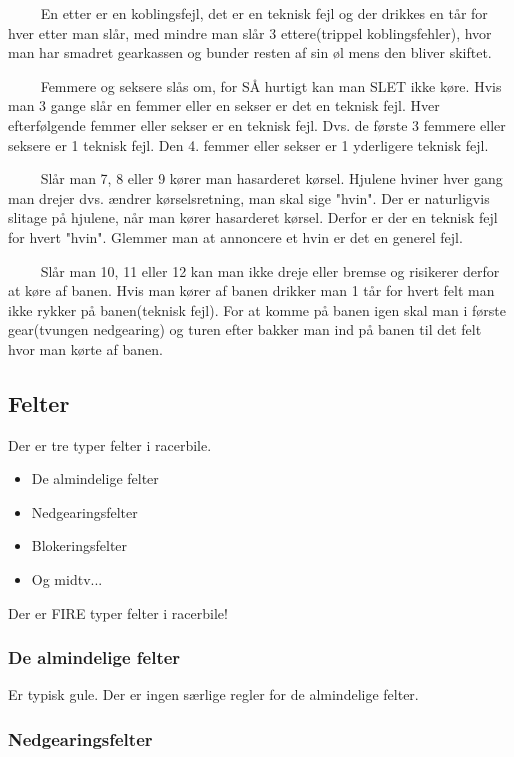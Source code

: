 \documentclass[12pt]{article}
\begin{document}
$\qquad$ En etter er en koblingsfejl, det er en teknisk fejl og der drikkes en tår for hver etter man slår, med mindre man slår 3 ettere(trippel koblingsfehler), hvor man har smadret gearkassen og bunder resten af sin øl mens den bliver skiftet.

$\qquad$ Femmere og seksere slås om, for SÅ hurtigt kan man SLET ikke køre. Hvis man 3 gange slår en femmer eller en sekser er det en teknisk fejl. Hver efterfølgende femmer eller sekser er en teknisk fejl. Dvs. de første 3 femmere eller seksere er 1 teknisk fejl. Den 4. femmer eller sekser er 1 yderligere teknisk fejl.

$\qquad$ Slår man 7, 8 eller 9 kører man hasarderet kørsel. Hjulene hviner hver gang man drejer dvs. ændrer kørselsretning, man skal sige "hvin". Der er naturligvis slitage på hjulene, når man kører hasarderet kørsel. Derfor er der en teknisk fejl for hvert "hvin". Glemmer man at annoncere et hvin er det en generel fejl.

$\qquad$  Slår man 10, 11 eller 12 kan man ikke dreje eller bremse og risikerer derfor at køre af banen. Hvis man kører af banen drikker man 1 tår for hvert felt man ikke rykker på banen(teknisk fejl). For at komme på banen igen skal man i første gear(tvungen nedgearing) og turen efter bakker man ind på banen til det felt hvor man kørte af banen.

\subsection*{Felter}

Der er tre typer felter i racerbile.

\begin{itemize}
	\item De almindelige felter
	\item Nedgearingsfelter
	\item Blokeringsfelter
	\item Og midtv...
\end{itemize}

Der er FIRE typer felter i racerbile!

\subsubsection*{De almindelige felter}

Er typisk gule. Der er ingen særlige regler for de almindelige felter.

\subsubsection*{Nedgearingsfelter}
\end{document}

